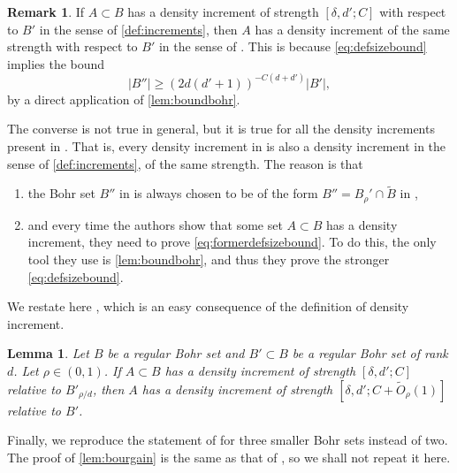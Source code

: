 \documentclass{daj}
\newtheorem{lemma}[theorem]{Lemma}
\theoremstyle{definition}
\newtheorem{remark}[theorem]{Remark}
\begin{document}
\begin{remark}
\label{rem:equivdensity}
If $A\subset B$ has a density increment of strength $[\delta, d'; C]$ with respect to $B'$ in the sense of \cref{def:increments}, then $A$ has a density increment of the same strength with respect to $B'$ in the sense of \cite[Definition~5.1]{BS}. This is because \cref{eq:defsizebound} implies the bound
\begin{equation}
\label{eq:formerdefsizebound}
|B''| \geq (2d(d'+1))^{-C(d+d')} |B'|,
\end{equation}
by a direct application of \cref{lem:boundbohr}.

The converse is not true in general, but it is true for all the density increments present in \cite{BS}. That is, every density increment in \cite{BS} is also a density increment in the sense of \cref{def:increments}, of the same strength. The reason is that
\begin{enumerate}
	\item the Bohr set $B''$ in \cite[Definition~5.1]{BS} is always chosen to be of the form $B'' = B_{\rho}' \cap \widetilde{B}$ in \cite{BS},
	\item and every time the authors show that some set $A\subset B$ has a density increment, they need to prove \cref{eq:formerdefsizebound}. To do this, the only tool they use is \cref{lem:boundbohr}, and thus they prove the stronger \cref{eq:defsizebound}.
\end{enumerate}
\end{remark}

We restate here \cite[Lemma~5.2]{BS}, which is an easy consequence of the definition of density increment.

\begin{lemma}
\label{lem:relativeincrements}
Let $B$ be a regular Bohr set and $B'\subset B$ be a regular Bohr set of rank $d$. Let $\rho \in (0, 1)$. If $A\subset B$ has a density increment of strength $[\delta, d'; C]$ relative to $B'_{\rho/d}$, then $A$ has a density increment of strength $[\delta, d'; C+\tilde{O}_{\rho}(1)]$ relative to $B'$.
\end{lemma}



Finally, we reproduce the statement of \cite[Lemma~12.1]{BS} for three smaller Bohr sets instead of two. The proof of \cref{lem:bourgain} is the same as that of \cite[Lemma~12.1]{BS}, so we shall not repeat it here.
\end{document}
